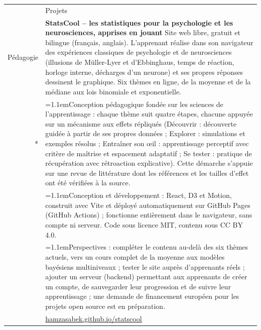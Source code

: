 \documentclass[a4paper, 11pt]{article}
\newcommand{\headingfont}{\Large\color{PineGreen}}
\newcommand{\bul}[1]{\hangindent=1.1em\hangafter=1\makebox[1.1em][l]{--}#1}
\newenvironment{SectionTable}[1]{
	\renewcommand*{\arraystretch}{1.1}
	\setlength{\tabcolsep}{8pt}
	\begin{longtable}{Rp{5.15in}} & #1 \\*}
{\end{longtable}\vspace{2pt}}
\begin{document}
\begin{SectionTable}{\headingfont Projets}
	Pédagogie &
	\textbf{StatsCool -- les statistiques pour la psychologie et les neurosciences, apprises en jouant} \href{https://hamzasabek.github.io/statscool/}{\faGlobe}\newline
	Site web libre, gratuit et bilingue (français, anglais). L'apprenant réalise dans son navigateur des expériences classiques de psychologie et de neurosciences (illusions de Müller-Lyer et d'Ebbinghaus, temps de réaction, horloge interne, décharges d'un neurone) et ses propres réponses dessinent le graphique. Six thèmes en ligne, de la moyenne et de la médiane aux lois binomiale et exponentielle. \\*
	& \bul{Conception pédagogique fondée sur les sciences de l'apprentissage : chaque thème suit quatre étapes, chacune appuyée sur un mécanisme aux effets répliqués (Découvrir : découverte guidée à partir de ses propres données ; Explorer : simulations et exemples résolus ; Entraîner son œil : apprentissage perceptif avec critère de maîtrise et espacement adaptatif ; Se tester : pratique de récupération avec rétroaction explicative). Cette démarche s'appuie sur une revue de littérature dont les références et les tailles d'effet ont été vérifiées à la source.} \\
	& \bul{Conception et développement : React, D3 et Motion, construit avec Vite et déployé automatiquement sur GitHub Pages (GitHub Actions) ; fonctionne entièrement dans le navigateur, sans compte ni serveur. Code sous licence MIT, contenu sous CC BY 4.0.} \\
	& \bul{Perspectives : compléter le contenu au-delà des six thèmes actuels, vers un cours complet de la moyenne aux modèles bayésiens multiniveaux ; tester le site auprès d'apprenants réels ; ajouter un serveur (backend) permettant aux apprenants de créer un compte, de sauvegarder leur progression et de suivre leur apprentissage ; une demande de financement européen pour les projets open source est en préparation.} \\
	& \href{https://hamzasabek.github.io/statscool/}{hamzasabek.github.io/statscool} \\
\end{SectionTable}
\end{document}
